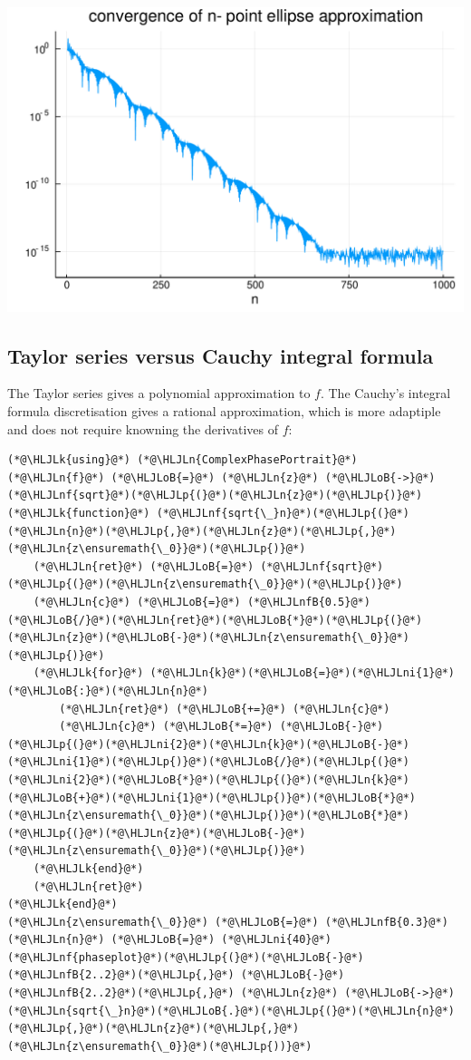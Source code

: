 \documentclass[12pt,a4paper]{article}
\newcommand{\HLJLk}[1]{\textcolor[RGB]{148,91,176}{\textbf{#1}}}
\newcommand{\HLJLn}[1]{#1}
\newcommand{\HLJLnf}[1]{\textcolor[RGB]{66,102,213}{#1}}
\newcommand{\HLJLnfB}[1]{\textcolor[RGB]{59,151,46}{#1}}
\newcommand{\HLJLni}[1]{\textcolor[RGB]{59,151,46}{#1}}
\newcommand{\HLJLoB}[1]{\textcolor[RGB]{102,102,102}{\textbf{#1}}}
\newcommand{\HLJLp}[1]{#1}
\begin{document}
\includegraphics[width=\linewidth]{figures/Lecture6_11_1.pdf}

\subsection{Taylor series versus Cauchy integral formula}
The Taylor series gives a polynomial approximation to $f$. The Cauchy's integral formula discretisation gives a rational approximation,  which is more adaptiple and does not require knowning the derivatives of $f$:


\begin{lstlisting}
(*@\HLJLk{using}@*) (*@\HLJLn{ComplexPhasePortrait}@*)
(*@\HLJLn{f}@*) (*@\HLJLoB{=}@*) (*@\HLJLn{z}@*) (*@\HLJLoB{->}@*) (*@\HLJLnf{sqrt}@*)(*@\HLJLp{(}@*)(*@\HLJLn{z}@*)(*@\HLJLp{)}@*)
(*@\HLJLk{function}@*) (*@\HLJLnf{sqrt{\_}n}@*)(*@\HLJLp{(}@*)(*@\HLJLn{n}@*)(*@\HLJLp{,}@*)(*@\HLJLn{z}@*)(*@\HLJLp{,}@*)(*@\HLJLn{z\ensuremath{\_0}}@*)(*@\HLJLp{)}@*) 
    (*@\HLJLn{ret}@*) (*@\HLJLoB{=}@*) (*@\HLJLnf{sqrt}@*)(*@\HLJLp{(}@*)(*@\HLJLn{z\ensuremath{\_0}}@*)(*@\HLJLp{)}@*)
    (*@\HLJLn{c}@*) (*@\HLJLoB{=}@*) (*@\HLJLnfB{0.5}@*)(*@\HLJLoB{/}@*)(*@\HLJLn{ret}@*)(*@\HLJLoB{*}@*)(*@\HLJLp{(}@*)(*@\HLJLn{z}@*)(*@\HLJLoB{-}@*)(*@\HLJLn{z\ensuremath{\_0}}@*)(*@\HLJLp{)}@*)
    (*@\HLJLk{for}@*) (*@\HLJLn{k}@*)(*@\HLJLoB{=}@*)(*@\HLJLni{1}@*)(*@\HLJLoB{:}@*)(*@\HLJLn{n}@*)
        (*@\HLJLn{ret}@*) (*@\HLJLoB{+=}@*) (*@\HLJLn{c}@*)
        (*@\HLJLn{c}@*) (*@\HLJLoB{*=}@*) (*@\HLJLoB{-}@*)(*@\HLJLp{(}@*)(*@\HLJLni{2}@*)(*@\HLJLn{k}@*)(*@\HLJLoB{-}@*)(*@\HLJLni{1}@*)(*@\HLJLp{)}@*)(*@\HLJLoB{/}@*)(*@\HLJLp{(}@*)(*@\HLJLni{2}@*)(*@\HLJLoB{*}@*)(*@\HLJLp{(}@*)(*@\HLJLn{k}@*)(*@\HLJLoB{+}@*)(*@\HLJLni{1}@*)(*@\HLJLp{)}@*)(*@\HLJLoB{*}@*)(*@\HLJLn{z\ensuremath{\_0}}@*)(*@\HLJLp{)}@*)(*@\HLJLoB{*}@*)(*@\HLJLp{(}@*)(*@\HLJLn{z}@*)(*@\HLJLoB{-}@*)(*@\HLJLn{z\ensuremath{\_0}}@*)(*@\HLJLp{)}@*)
    (*@\HLJLk{end}@*)
    (*@\HLJLn{ret}@*)
(*@\HLJLk{end}@*)
(*@\HLJLn{z\ensuremath{\_0}}@*) (*@\HLJLoB{=}@*) (*@\HLJLnfB{0.3}@*)
(*@\HLJLn{n}@*) (*@\HLJLoB{=}@*) (*@\HLJLni{40}@*)
(*@\HLJLnf{phaseplot}@*)(*@\HLJLp{(}@*)(*@\HLJLoB{-}@*)(*@\HLJLnfB{2..2}@*)(*@\HLJLp{,}@*) (*@\HLJLoB{-}@*)(*@\HLJLnfB{2..2}@*)(*@\HLJLp{,}@*) (*@\HLJLn{z}@*) (*@\HLJLoB{->}@*) (*@\HLJLn{sqrt{\_}n}@*)(*@\HLJLoB{.}@*)(*@\HLJLp{(}@*)(*@\HLJLn{n}@*)(*@\HLJLp{,}@*)(*@\HLJLn{z}@*)(*@\HLJLp{,}@*)(*@\HLJLn{z\ensuremath{\_0}}@*)(*@\HLJLp{))}@*)
\end{lstlisting}
\end{document}
